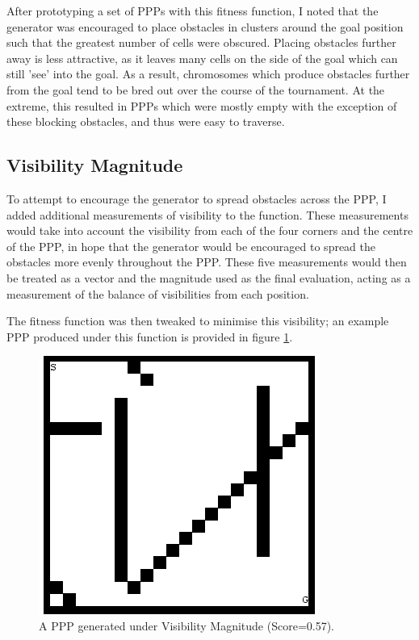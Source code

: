 \documentclass[authoryearcitations]{UoYCSproject}
\begin{document}
After prototyping a set of PPPs with this fitness function, I noted that the generator was encouraged to place obstacles in clusters around the goal position such that the greatest number of cells were obscured. Placing obstacles further away is less attractive, as it leaves many cells on the side of the goal which can still 'see' into the goal. As a result, chromosomes which produce obstacles further from the goal tend to be bred out over the course of the tournament. At the extreme, this resulted in PPPs which were mostly empty with the exception of these blocking obstacles, and thus were easy to traverse.

\subsection{Visibility Magnitude}
\label{sec:visMag}
To attempt to encourage the generator to spread obstacles across the PPP, I added additional measurements of visibility to the function. These measurements would take into account the visibility from each of the four corners and the centre of the PPP, in hope that the generator would be encouraged to spread the obstacles more evenly throughout the PPP. These five measurements would then be treated as a vector and the magnitude used as the final evaluation, acting as a measurement of the balance of visibilities from each position.

The fitness function was then tweaked to minimise this visibility; an example PPP produced under this function is provided in figure \ref{fig:vis_mag_ppp}.

\begin{figure}
\graphicspath{ {DesignImpPics/} }
\includegraphics[scale=0.65]{visMag.png}
\caption{A PPP generated under Visibility Magnitude (Score=0.57).}
\label{fig:vis_mag_ppp}
\end{figure}
\end{document}
